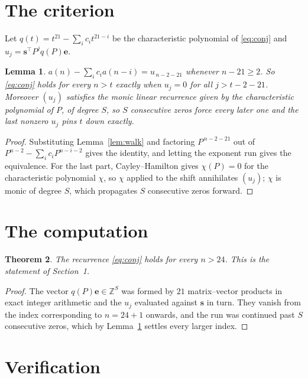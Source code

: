 \documentclass[11pt,a4paper]{article}
\theoremstyle{plain}
\newtheorem{theorem}{Theorem}
\newtheorem{lemma}[theorem]{Lemma}
\theoremstyle{definition}
\begin{document}
\section{The criterion}

Let $q(t)=t^{21}-\sum_i c_i t^{21-i}$ be the characteristic polynomial of
\eqref{eq:conj} and $u_j=\mathbf{s}^{\!\top}P^{j}q(P)\mathbf{e}$.

\begin{lemma}\label{lem:crit}
$a(n)-\sum_i c_i a(n-i)=u_{\,n-2-21}$ whenever $n-21\ge2$. So \eqref{eq:conj}
holds for every $n>t$ exactly when $u_j=0$ for all $j>t-2-21$. Moreover $(u_j)$
satisfies the monic linear recurrence given by the characteristic polynomial of $P$, of
degree $S$, so $S$ consecutive zeros force every later one and the last nonzero $u_j$ pins
$t$ down exactly.
\end{lemma}

\begin{proof}
Substituting Lemma~\ref{lem:walk} and factoring $P^{\,n-2-21}$ out of
$P^{n-2}-\sum_i c_i P^{n-i-2}$ gives the identity, and letting the exponent run gives the
equivalence. For the last part, Cayley--Hamilton gives $\chi(P)=0$ for the characteristic
polynomial $\chi$, so $\chi$ applied to the shift annihilates $(u_j)$; $\chi$ is monic of
degree $S$, which propagates $S$ consecutive zeros forward.
\end{proof}

\section{The computation}

\begin{theorem}
The recurrence \eqref{eq:conj} holds for every $n>24$. This is the statement of
Section~1.
\end{theorem}

\begin{proof}
The vector $q(P)\mathbf{e}\in\mathbb{Z}^{S}$ was formed by $21$ matrix--vector
products in exact integer arithmetic and the $u_j$ evaluated against $\mathbf{s}$ in turn.
They vanish from the index corresponding to $n=24+1$ onwards, and the run was continued
past $S$ consecutive zeros, which by Lemma~\ref{lem:crit} settles every larger index.
\end{proof}

\section{Verification}
\end{document}
